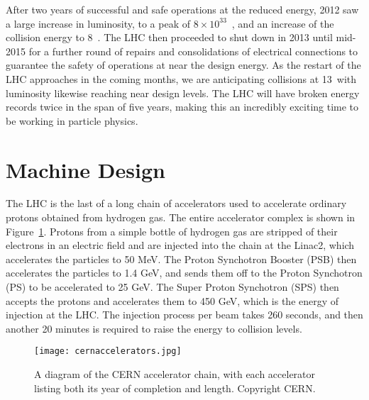 After two years of successful and safe operations at the reduced energy, 2012 saw a large increase in luminosity, to a peak of $8\times10^{33}$~\lumirate, and an increase of the collision energy to 8~\TeV. The LHC then proceeded to shut down in 2013 until mid-2015 for a further round of repairs and consolidations of electrical connections to guarantee the safety of operations at near the design energy. As the restart of the LHC approaches in the coming months, we are anticipating collisions at 13~\TeV with luminosity likewise reaching near design levels. The LHC will have broken energy records twice in the span of five years, making this an incredibly exciting time to be working in particle physics.


\section{Machine Design}

The LHC is the last of a long chain of accelerators used to accelerate ordinary protons obtained from hydrogen gas\cite{cern-accelerators}. The entire accelerator complex is shown in Figure~\ref{fig:lhc:cern-accelerators}. Protons from a simple bottle of hydrogen gas are stripped of their electrons in an electric field and are injected into the chain at the Linac2, which accelerates the particles to 50 MeV. The Proton Synchotron Booster (PSB) then accelerates the particles to 1.4 GeV, and sends them off to the Proton Synchotron (PS) to be accelerated to 25 GeV. The Super Proton Synchotron (SPS) then accepts the protons and accelerates them to 450 GeV, which is the energy of injection at the LHC. The injection process per beam takes 260 seconds, and then another 20 minutes is required to raise the energy to collision levels.


\begin{figure}
\centering
\texttt{[image: cernaccelerators.jpg]}
\label{fig:lhc:cern-accelerators}
\caption{A diagram of the CERN accelerator chain, with each accelerator listing both its year of completion and length. Copyright CERN.}
\end{figure}


